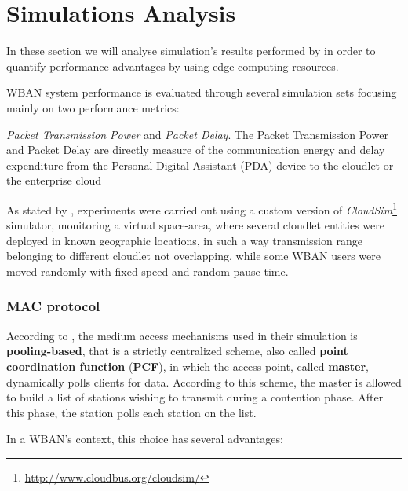 \documentclass[sigchi]{acmart}
\begin{document}
\section{Simulations Analysis}

In these section we will analyse simulation's results performed by \citet{MSAReport} in order to quantify performance advantages by using edge computing resources. 

WBAN system performance is evaluated through several simulation sets focusing mainly on two performance metrics:

\vspace{0.3cm}

\begin{quoting}[font=itshape, begintext={``}, endtext={''\cite[par.~4.2]{MSAReport}}]
\textit{Packet Transmission Power} and \textit{Packet Delay}. The Packet Transmission Power and Packet Delay are directly measure of the communication energy and delay expenditure from the Personal Digital Assistant (PDA) device to the cloudlet or the enterprise cloud
\end{quoting}

\vspace{0.3cm}

As stated by \citet{MSAReport}, experiments were carried out using a custom version of \textit{CloudSim}\footnote{\url{http://www.cloudbus.org/cloudsim/}} simulator, monitoring a virtual space-area, where several cloudlet entities were deployed in known geographic locations, in such a way transmission range belonging to different cloudlet not overlapping, while some WBAN users were moved randomly with fixed speed and random pause time.

\subsubsection{MAC protocol}

According to \citet{MSAReport}, the medium access mechanisms used in their simulation is \textbf{pooling-based}, that is a strictly centralized scheme, also called \textbf{point coordination function} (\textbf{PCF}), in which the access point, called \textbf{master}, dynamically polls clients for data. According to this scheme, the master is allowed to build a list of stations wishing to transmit during a contention phase. After this phase, the station polls each station on the list.

In a WBAN's context, this choice has several advantages:
\end{document}
